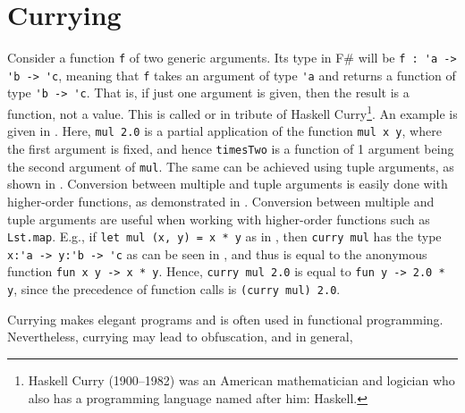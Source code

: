 \documentclass[fsharpnotes.tex]{subfiles}
\begin{document}
\section{Currying}
Consider a function \lstinline{f} of two generic arguments. Its type in F\# will be \lstinline{f : 'a -> 'b -> 'c}, meaning that \lstinline{f} takes an argument of type \lstinline{'a} and returns a function of type \lstinline{'b -> 'c}. That is, if just one argument is given, then the result is a function, not a value. This is called  or  in tribute of Haskell Curry\footnote{Haskell Curry (1900--1982) was an American mathematician and logician who also has a programming language named after him: Haskell.}. An example is given in .
%
%
Here, \lstinline{mul 2.0} is a partial application of the function \lstinline{mul x y}, where the first argument is fixed, and hence \lstinline{timesTwo} is a function of 1 argument being the second argument of \lstinline{mul}. The same can be achieved using tuple arguments, as shown in .
%
%
Conversion between multiple and tuple arguments is easily done with higher-order functions, as demonstrated in .
%
%
Conversion between multiple and tuple arguments are useful when working with higher-order functions such as \lstinline{Lst.map}. E.g., if \lstinline{let mul (x, y) = x * y} as in , then \lstinline{curry mul} has the type \lstinline{x:'a -> y:'b -> 'c} as can be seen in , and thus is equal to the anonymous function \lstinline{fun x y -> x * y}. Hence, \lstinline{curry mul 2.0} is equal to \lstinline{fun y -> 2.0 * y}, since the precedence of function calls is \lstinline{(curry mul) 2.0}. 

Currying makes elegant programs and is often used in functional programming. Nevertheless, currying may lead to obfuscation, and in general, 
\end{document}
